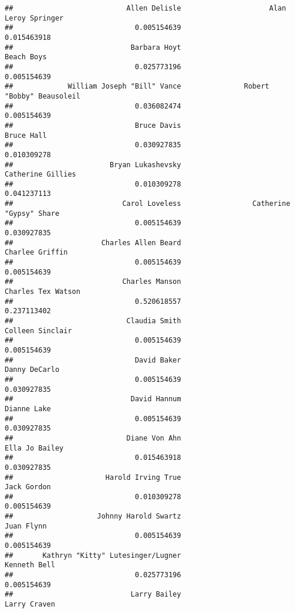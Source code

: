 \documentclass[
]{article}
\begin{document}
\begin{verbatim}
##                           Allen Delisle                     Alan Leroy Springer 
##                             0.005154639                             0.015463918 
##                            Barbara Hoyt                              Beach Boys 
##                             0.025773196                             0.005154639 
##             William Joseph "Bill" Vance               Robert "Bobby" Beausoleil 
##                             0.036082474                             0.005154639 
##                             Bruce Davis                              Bruce Hall 
##                             0.030927835                             0.010309278 
##                       Bryan Lukashevsky                       Catherine Gillies 
##                             0.010309278                             0.041237113 
##                          Carol Loveless                 Catherine "Gypsy" Share 
##                             0.005154639                             0.030927835 
##                     Charles Allen Beard                         Charlee Griffin 
##                             0.005154639                             0.005154639 
##                          Charles Manson                      Charles Tex Watson 
##                             0.520618557                             0.237113402 
##                           Claudia Smith                        Colleen Sinclair 
##                             0.005154639                             0.005154639 
##                             David Baker                           Danny DeCarlo 
##                             0.005154639                             0.030927835 
##                            David Hannum                             Dianne Lake 
##                             0.005154639                             0.030927835 
##                           Diane Von Ahn                          Ella Jo Bailey 
##                             0.015463918                             0.030927835 
##                      Harold Irving True                             Jack Gordon 
##                             0.010309278                             0.005154639 
##                    Johnny Harold Swartz                              Juan Flynn 
##                             0.005154639                             0.005154639 
##       Kathryn "Kitty" Lutesinger/Lugner                            Kenneth Bell 
##                             0.025773196                             0.005154639 
##                            Larry Bailey                            Larry Craven 

\end{verbatim}
\end{document}
